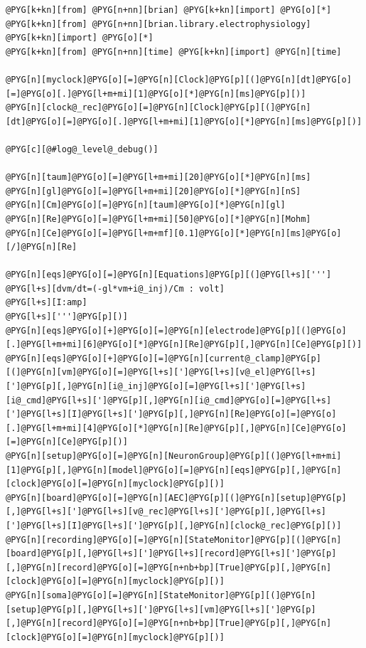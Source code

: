 \documentclass[letterpaper,10pt,english]{manual}
\begin{document}
\begin{Verbatim}[commandchars=@\[\]]
@PYG[k+kn][from] @PYG[n+nn][brian] @PYG[k+kn][import] @PYG[o][*]
@PYG[k+kn][from] @PYG[n+nn][brian.library.electrophysiology] @PYG[k+kn][import] @PYG[o][*]
@PYG[k+kn][from] @PYG[n+nn][time] @PYG[k+kn][import] @PYG[n][time]

@PYG[n][myclock]@PYG[o][=]@PYG[n][Clock]@PYG[p][(]@PYG[n][dt]@PYG[o][=]@PYG[o][.]@PYG[l+m+mi][1]@PYG[o][*]@PYG[n][ms]@PYG[p][)]
@PYG[n][clock@_rec]@PYG[o][=]@PYG[n][Clock]@PYG[p][(]@PYG[n][dt]@PYG[o][=]@PYG[o][.]@PYG[l+m+mi][1]@PYG[o][*]@PYG[n][ms]@PYG[p][)]

@PYG[c][@#log@_level@_debug()]

@PYG[n][taum]@PYG[o][=]@PYG[l+m+mi][20]@PYG[o][*]@PYG[n][ms]
@PYG[n][gl]@PYG[o][=]@PYG[l+m+mi][20]@PYG[o][*]@PYG[n][nS]
@PYG[n][Cm]@PYG[o][=]@PYG[n][taum]@PYG[o][*]@PYG[n][gl]
@PYG[n][Re]@PYG[o][=]@PYG[l+m+mi][50]@PYG[o][*]@PYG[n][Mohm]
@PYG[n][Ce]@PYG[o][=]@PYG[l+m+mf][0.1]@PYG[o][*]@PYG[n][ms]@PYG[o][/]@PYG[n][Re]

@PYG[n][eqs]@PYG[o][=]@PYG[n][Equations]@PYG[p][(]@PYG[l+s][''']
@PYG[l+s][dvm/dt=(-gl*vm+i@_inj)/Cm : volt]
@PYG[l+s][I:amp]
@PYG[l+s][''']@PYG[p][)]
@PYG[n][eqs]@PYG[o][+]@PYG[o][=]@PYG[n][electrode]@PYG[p][(]@PYG[o][.]@PYG[l+m+mi][6]@PYG[o][*]@PYG[n][Re]@PYG[p][,]@PYG[n][Ce]@PYG[p][)]
@PYG[n][eqs]@PYG[o][+]@PYG[o][=]@PYG[n][current@_clamp]@PYG[p][(]@PYG[n][vm]@PYG[o][=]@PYG[l+s][']@PYG[l+s][v@_el]@PYG[l+s][']@PYG[p][,]@PYG[n][i@_inj]@PYG[o][=]@PYG[l+s][']@PYG[l+s][i@_cmd]@PYG[l+s][']@PYG[p][,]@PYG[n][i@_cmd]@PYG[o][=]@PYG[l+s][']@PYG[l+s][I]@PYG[l+s][']@PYG[p][,]@PYG[n][Re]@PYG[o][=]@PYG[o][.]@PYG[l+m+mi][4]@PYG[o][*]@PYG[n][Re]@PYG[p][,]@PYG[n][Ce]@PYG[o][=]@PYG[n][Ce]@PYG[p][)]
@PYG[n][setup]@PYG[o][=]@PYG[n][NeuronGroup]@PYG[p][(]@PYG[l+m+mi][1]@PYG[p][,]@PYG[n][model]@PYG[o][=]@PYG[n][eqs]@PYG[p][,]@PYG[n][clock]@PYG[o][=]@PYG[n][myclock]@PYG[p][)]
@PYG[n][board]@PYG[o][=]@PYG[n][AEC]@PYG[p][(]@PYG[n][setup]@PYG[p][,]@PYG[l+s][']@PYG[l+s][v@_rec]@PYG[l+s][']@PYG[p][,]@PYG[l+s][']@PYG[l+s][I]@PYG[l+s][']@PYG[p][,]@PYG[n][clock@_rec]@PYG[p][)]
@PYG[n][recording]@PYG[o][=]@PYG[n][StateMonitor]@PYG[p][(]@PYG[n][board]@PYG[p][,]@PYG[l+s][']@PYG[l+s][record]@PYG[l+s][']@PYG[p][,]@PYG[n][record]@PYG[o][=]@PYG[n+nb+bp][True]@PYG[p][,]@PYG[n][clock]@PYG[o][=]@PYG[n][myclock]@PYG[p][)]
@PYG[n][soma]@PYG[o][=]@PYG[n][StateMonitor]@PYG[p][(]@PYG[n][setup]@PYG[p][,]@PYG[l+s][']@PYG[l+s][vm]@PYG[l+s][']@PYG[p][,]@PYG[n][record]@PYG[o][=]@PYG[n+nb+bp][True]@PYG[p][,]@PYG[n][clock]@PYG[o][=]@PYG[n][myclock]@PYG[p][)]


\end{Verbatim}
\end{document}
